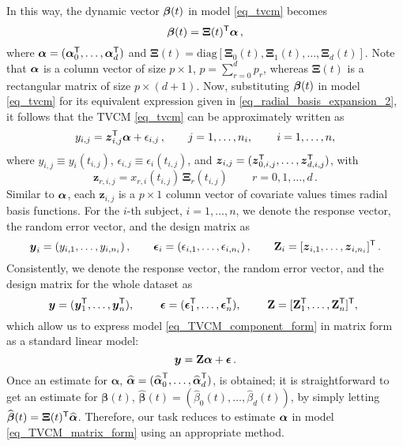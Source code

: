 \documentclass[letterpaper,10pt,openany]{article}
\def\Z{\mathbf{Z}}\def\z{\mathbf{z}}\def\Zv{\boldsymbol{Z}}\def\zv{\boldsymbol{z}}
\def\eps{\epsilon}\def\epsv{\boldsymbol{\epsilon}}
\def\epsv{\boldsymbol{\eps}}
\def\Xiv{\boldsymbol{\Xi}}
\def\alphav{\boldsymbol{\alpha}}
\def\betav{\boldsymbol{\beta}}
\def\trans{\text{\textsf{T}}}
\begin{document}
In this way, the dynamic vector $\boldsymbol{\beta}(t)$ in model \eqref{eq_tvcm} becomes
\begin{equation}\label{eq_radial_basis_expansion_2}
\bev(t)=\Xiv(t)^\trans \alv\,,
\end{equation}
where $\alv=(\alv_0^\trans,\ldots,\alv_d^\trans)$ and $\Xiv(t)=\text{diag}[\Xiv_{0}(t),\Xiv_{1}(t),\ldots,\Xiv_{d}(t)]$. Note that $\boldsymbol{\alpha}$ is a column vector of size $p\times 1$, $p=\sum_{r=0}^d p_r$, whereas $\Xiv(t)$ is a rectangular matrix of size $p\times (d+1)$. Now, substituting $\boldsymbol{\beta}(t)$ in model \eqref{eq_tvcm} for its equivalent expression given in \eqref{eq_radial_basis_expansion_2}, it follows that the \textsf{TVCM} \eqref{eq_tvcm} can be approximately written as
\begin{equation}\label{eq_TVCM_component_form}
\begin{gathered}
y_{i,j} = \zv_{i,j}^\trans\alv + \eps_{i,j}\,,\qquad
j=1,\ldots,n_i, \,\qquad i=1,\ldots,n,
\end{gathered}
\end{equation}
where $y_{i,j} \equiv y_i(t_{i,j})$, $\eps_{i,j} \equiv \eps_i(t_{i,j})$, and $\zv_{i,j} = (\zv_{0,i,j}^\trans,\ldots,\zv_{d,i,j}^\trans)$, with 
\begin{equation}\label{eq_z_rij}
\zv_{r,i,j}=x_{r,i}(t_{i,j})\,\Xiv_{r}(t_{i,j})\,\qquad r = 0,1,\ldots,d\,.
\end{equation} 
Similar to $\boldsymbol{\alpha}$, each $\zv_{i,j}$ is a $p\times 1$ column vector of covariate values times radial basis functions. For the $i$-th subject, $i=1,\ldots,n$, we denote the response vector, the random error vector, and the design matrix as
$$
\yv_i   = (y_{i,1},   \ldots,y_{i,n_i})   \,, \qquad 
\epsv_i = (\eps_{i,1},\ldots,\eps_{i,n_i})\,, \qquad  
\Z_i    = [\zv_{i,1}, \ldots,\zv_{i,n_i}]^\trans\,.
$$
Consistently, we denote the response vector, the random error vector, and the design matrix  for the whole dataset as 
$$
\yv   = (\yv_1^\trans,\ldots,\yv_n^\trans),\,\, \qquad
\epsv = (\epsv_1^\trans,\ldots,\epsv_n^\trans),\,\, \qquad 
\Z    = [\Z_1^\trans, \ldots,\Z_n^\trans]^\trans,\,\, 
$$
which allow us to express model \eqref{eq_TVCM_component_form} in matrix form as a standard linear model:
\begin{equation}\label{eq_TVCM_matrix_form}
\yv=\Z\alv + \epsv\,.
\end{equation}
Once an estimate for $\alphav$, $\widehat{\alphav}=(\widehat{\alphav}_0^\trans,\ldots,\widehat{\alphav}_d^\trans)$, is obtained; it is straightforward to get an estimate for $\betav(t)$, $\widehat{\betav}(t)=(\widehat{\beta}_0(t),\ldots,\widehat{\beta}_d(t))$, by simply letting $\widehat{\betav}(t)= \Xiv(t)^\trans \widehat{\alphav}$. Therefore, our task reduces to estimate $\boldsymbol{\alpha}$ in model \eqref{eq_TVCM_matrix_form} using an appropriate method. 
\end{document}
